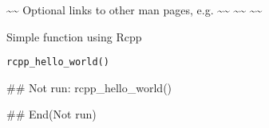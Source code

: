 \documentclass[letterpaper]{book}
\begin{document}
%
\begin{SeeAlso}\relax
\textasciitilde{}\textasciitilde{} Optional links to other man pages, e.g. \textasciitilde{}\textasciitilde{}
\textasciitilde{}\textasciitilde{}  \textasciitilde{}\textasciitilde{}
\end{SeeAlso}
%
\begin{Description}\relax
Simple function using Rcpp
\end{Description}
%
\begin{Usage}
\begin{verbatim}
rcpp_hello_world()	
\end{verbatim}
\end{Usage}
%
\begin{Examples}
\begin{ExampleCode}
## Not run: 
rcpp_hello_world()

## End(Not run)
\end{ExampleCode}
\end{Examples}
\printindex{}
\end{document}
